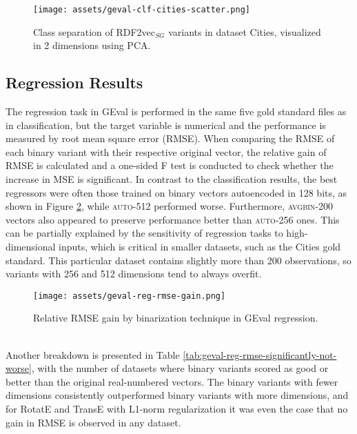 \documentclass[11pt,titlepage,oneside,openany]{book}
\begin{document}
\begin{figure}[h!]
    \centering
    \centerline{\texttt{[image: assets/geval-clf-cities-scatter.png]}}
    \vspace*{-3mm}
    \caption{Class separation of RDF2vec$_{SG}$ variants in dataset Cities, visualized in 2 dimensions using PCA.}
    \label{fig:geval-clf-cities-scatter}
\end{figure}

\subsection{Regression Results}
\label{subsec:geval-reg}

The regression task in GEval is performed in the same five gold standard files as in classification, but the target variable is numerical and the performance is measured by root mean square error (RMSE). When comparing the RMSE of each binary variant with their respective original vector, the relative gain of RMSE is calculated and a one-sided F test is conducted to check whether the increase in MSE is significant. In contrast to the classification results, the best regressors were often those trained on binary vectors autoencoded in 128 bits, as shown in Figure \ref{fig:geval-reg-rmse-gain}, while \textsc{auto-512} performed worse. Furthermore, \textsc{avgbin-200} vectors also appeared to preserve performance better than \textsc{auto-256} ones. This can be partially explained by the sensitivity of regression tasks to high-dimensional inputs, which is critical in smaller datasets, such as the Cities gold standard. This particular dataset contains slightly more than 200 observations, so variants with 256 and 512 dimensions tend to always overfit.\\
\begin{figure}[h!]
    \centering
    \centerline{\texttt{[image: assets/geval-reg-rmse-gain.png]}}
    \vspace*{-3mm}
    \caption{Relative RMSE gain by binarization technique in GEval regression.}
    \label{fig:geval-reg-rmse-gain}
\end{figure}
\\
Another breakdown is presented in Table \ref{tab:geval-reg-rmse-significantly-not-worse}, with the number of datasets where binary variants scored as good or better than the original real-numbered vectors. The binary variants with fewer dimensions consistently outperformed binary variants with more dimensions, and for RotatE and TransE with L1-norm regularization it was even the case that no gain in RMSE is observed in any dataset.\\
\end{document}
